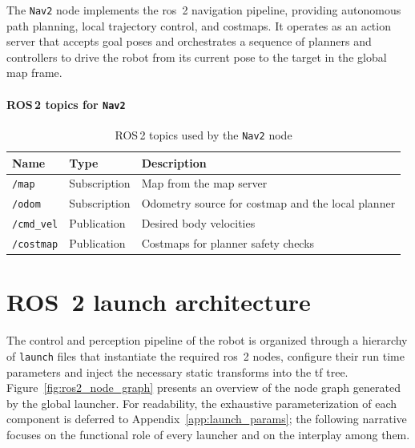 The \texttt{Nav2} node implements the \gls{ros}~2 navigation pipeline, providing autonomous path planning, local trajectory control, and \glspl{costmap}. It operates as an action server that accepts goal poses and orchestrates a sequence of planners and controllers to drive the robot from its current pose to the target in the global map frame.

\paragraph*{ROS\,2 topics for \texttt{Nav2}}
\begin{table}[H]
  \centering
  \begin{tabular}{lll}
    \toprule
    \textbf{Name}                   & \textbf{Type} & \textbf{Description}                               \\
    \midrule
    \texttt{/map}                   & Subscription  & Map from the map server                            \\
    \texttt{/odom}                  & Subscription  & Odometry source for costmap and the local planner \\
    \texttt{/cmd\_vel}              & Publication   & Desired body velocities                            \\
    \texttt{/costmap} & Publication   & Costmaps for planner safety checks                 \\
    \bottomrule
  \end{tabular}
  \caption{ROS\,2 topics used by the \texttt{Nav2} node}
  \label{tab:nav2-topics}
\end{table}

\section{ROS~2 launch architecture}\label{sec:ros2_launch_architecture}

The control and perception pipeline of the robot is organized through a hierarchy of \texttt{launch} files that instantiate the required \gls{ros}~2 nodes, configure their run time parameters and inject the necessary static transforms into the \gls{tf} tree. Figure~\ref{fig:ros2_node_graph} presents an overview of the node graph generated by the global launcher. For readability, the exhaustive parameterization of each component is deferred to Appendix~\ref{app:launch_params}; the following narrative focuses on the functional role of every launcher and on the interplay among them.

